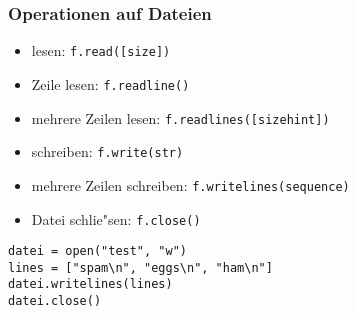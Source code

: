 \begin{frame}[fragile]
\frametitle{Operationen auf Dateien}
\begin{itemize}
\item lesen: \lstinline{f.read([size])}
\item Zeile lesen: \lstinline{f.readline()}
\item mehrere Zeilen lesen: \lstinline{f.readlines([sizehint])}
\item schreiben: \lstinline{f.write(str)}
\item mehrere Zeilen schreiben: \lstinline{f.writelines(sequence)}
\item Datei schlie"sen: \lstinline{f.close()}
\end{itemize}
\begin{lstlisting}[style=Python]
datei = open("test", "w")
lines = ["spam\n", "eggs\n", "ham\n"]
datei.writelines(lines)
datei.close()
\end{lstlisting}
\end{frame}
